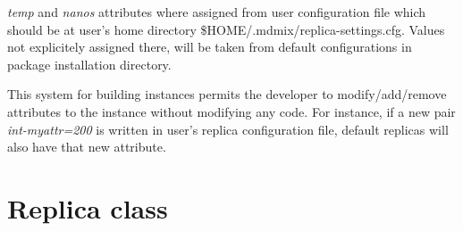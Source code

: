 \documentclass[letterpaper,10pt,english]{sphinxmanual}
\begin{document}
\emph{temp} and \emph{nanos} attributes where assigned from user configuration file which should be at user's home
directory \$HOME/.mdmix/replica-settings.cfg. Values not explicitely assigned there, will be taken from
default configurations in package installation directory.

This system for building instances permits the developer to modify/add/remove attributes to the instance without
modifying any code. For instance, if a new pair \emph{int-myattr=200} is written in user's replica configuration file,
default replicas will also have that new attribute.


\section{Replica class}
\label{replicas:replica-class}
\end{document}
